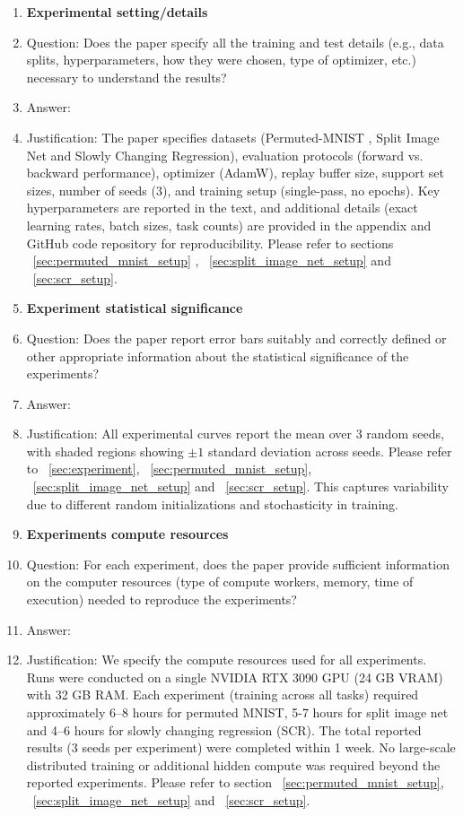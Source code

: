 \documentclass{article}
\begin{document}
\begin{enumerate}
\item {\bf Experimental setting/details}
    \item[] Question: Does the paper specify all the training and test details (e.g., data splits, hyperparameters, how they were chosen, type of optimizer, etc.) necessary to understand the results?
    \item[] Answer:  \answerYes{} %
    \item[] Justification: The paper specifies datasets (Permuted-MNIST , Split Image Net and Slowly Changing Regression), evaluation protocols (forward vs. backward performance), optimizer (AdamW), replay buffer size, support set sizes, number of seeds (3), and training setup (single-pass, no epochs). Key hyperparameters are reported in the text, and additional details (exact learning rates, batch sizes, task counts) are provided in the appendix and GitHub code repository for reproducibility. Please refer to sections ~\ref{sec:permuted_mnist_setup} ,  ~\ref{sec:split_image_net_setup} and ~\ref{sec:scr_setup}.


\item {\bf Experiment statistical significance}
    \item[] Question: Does the paper report error bars suitably and correctly defined or other appropriate information about the statistical significance of the experiments?
    \item[] Answer: \answerYes{} %
    \item[] Justification: All experimental curves report the mean over 3 random seeds, with shaded regions showing $\pm 1$ standard deviation across seeds. Please refer to ~\ref{sec:experiment}, ~\ref{sec:permuted_mnist_setup}, ~\ref{sec:split_image_net_setup} and ~\ref{sec:scr_setup}.
    This captures variability due to different random initializations and stochasticity in training.  

\item {\bf Experiments compute resources}
    \item[] Question: For each experiment, does the paper provide sufficient information on the computer resources (type of compute workers, memory, time of execution) needed to reproduce the experiments?
    \item[] Answer: \answerYes{}%
    \item[] Justification: We specify the compute resources used for all experiments. Runs were conducted on a single NVIDIA RTX 3090 GPU (24 GB VRAM) with 32 GB RAM. Each experiment (training across all tasks) required approximately 6–8 hours for permuted MNIST, 5-7 hours for split image net and 4–6 hours for slowly changing regression (SCR). The total reported results (3 seeds per experiment) were completed within 1 week. No large-scale distributed training or additional hidden compute was required beyond the reported experiments. Please refer to section ~\ref{sec:permuted_mnist_setup}, ~\ref{sec:split_image_net_setup} and ~\ref{sec:scr_setup}.


\end{enumerate}
\end{document}

